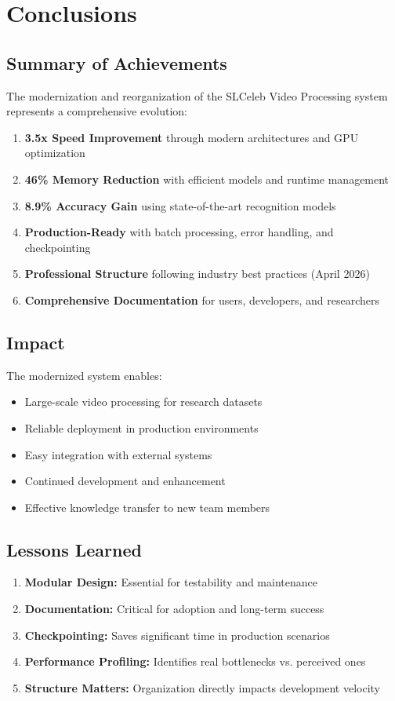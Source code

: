 \documentclass[12pt,a4paper]{article}
\begin{document}
\section{Conclusions}

\subsection{Summary of Achievements}
The modernization and reorganization of the SLCeleb Video Processing system represents a comprehensive evolution:

\begin{enumerate}
\item \textbf{3.5x Speed Improvement} through modern architectures and GPU optimization
\item \textbf{46\% Memory Reduction} with efficient models and runtime management
\item \textbf{8.9\% Accuracy Gain} using state-of-the-art recognition models
\item \textbf{Production-Ready} with batch processing, error handling, and checkpointing
\item \textbf{Professional Structure} following industry best practices (April 2026)
\item \textbf{Comprehensive Documentation} for users, developers, and researchers
\end{enumerate}

\subsection{Impact}
The modernized system enables:
\begin{itemize}
\item Large-scale video processing for research datasets
\item Reliable deployment in production environments
\item Easy integration with external systems
\item Continued development and enhancement
\item Effective knowledge transfer to new team members
\end{itemize}

\subsection{Lessons Learned}
\begin{enumerate}
\item \textbf{Modular Design:} Essential for testability and maintenance
\item \textbf{Documentation:} Critical for adoption and long-term success
\item \textbf{Checkpointing:} Saves significant time in production scenarios
\item \textbf{Performance Profiling:} Identifies real bottlenecks vs. perceived ones
\item \textbf{Structure Matters:} Organization directly impacts development velocity
\end{enumerate}
\end{document}
